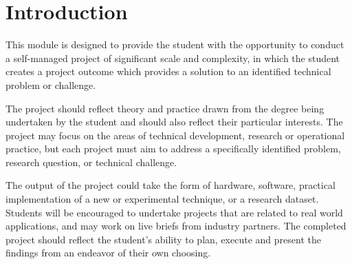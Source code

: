 \chapter{Introduction}

This module is designed to provide the student with the opportunity to conduct a self-managed project of significant scale and complexity, in which the student creates a project outcome which provides a solution to an identified technical problem or challenge.

The project should reflect theory and practice drawn from the degree being undertaken by the student and should also reflect their particular interests. The project may focus on the areas of technical development, research or operational practice, but each project must aim to address a specifically identified problem, research question, or technical challenge.

The output of the project could take the form of hardware, software, practical implementation of a new or experimental technique, or a research dataset. Students will be encouraged to undertake projects that are related to real world applications, and may work on live briefs from industry partners. The completed project should reflect the student’s ability to plan, execute and present the findings from an endeavor of their own choosing.